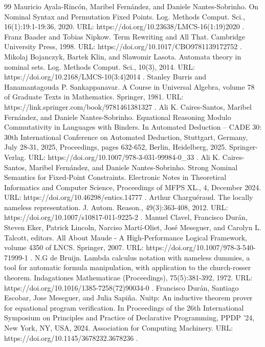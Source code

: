 \documentclass[10pt,a4paper]{amsart}
\begin{document}
\begin{thebibliography}{99}
 Mauricio Ayala-Rincón, Maribel Fernández, and Daniele Nantes-Sobrinho. On Nominal Syntax and Permutation Fixed Points. Log. Methods Comput. Sci., 16(1):19:1-19:36, 2020. URL: https://doi.org/10.23638/LMCS-16(1:19)2020 .
 Franz Baader and Tobias Nipkow. Term Rewriting and All That. Cambridge University Press, 1998. URL: https://doi.org/10.1017/CBO9781139172752 .
 Mikolaj Bojanczyk, Bartek Klin, and Slawomir Lasota. Automata theory in nominal sets. Log. Methods Comput. Sci., 10(3), 2014. URL: https://doi.org/10.2168/LMCS-10(3:4)2014 .
 Stanley Burris and Hanamantagouda P. Sankappanavar. A Course in Universal Algebra, volume 78 of Graduate Texts in Mathematics. Springer, 1981. URL: https://link.springer.com/book/9781461381327 .
 Ali K. Caires-Santos, Maribel Fernández, and Daniele Nantes-Sobrinho. Equational Reasoning Modulo Commutativity in Languages with Binders. In Automated Deduction – CADE 30: 30th International Conference on Automated Deduction, Stuttgart, Germany, July 28-31, 2025, Proceedings, pages 632-652, Berlin, Heidelberg, 2025. Springer-Verlag. URL: https://doi.org/10.1007/978-3-031-99984-0\_33 .
 Ali K. Caires-Santos, Maribel Fernández, and Daniele Nantes-Sobrinho. Strong Nominal Semantics for Fixed-Point Constraints. Electronic Notes in Theoretical Informatics and Computer Science, Proceedings of MFPS XL., 4, December 2024. URL: https://doi.org/10.46298/entics.14777 .
 Arthur Charguéraud. The locally nameless representation. J. Autom. Reason., 49(3):363-408, 2012. URL: https://doi.org/10.1007/s10817-011-9225-2 .
 Manuel Clavel, Francisco Durán, Steven Eker, Patrick Lincoln, Narciso Martí-Oliet, José Meseguer, and Carolyn L. Talcott, editors. All About Maude - A High-Performance Logical Framework, volume 4350 of LNCS. Springer, 2007. URL: https://doi.org/10.1007/978-3-540-71999-1 .
 N.G de Bruijn. Lambda calculus notation with nameless dummies, a tool for automatic formula manipulation, with application to the church-rosser theorem. Indagationes Mathematicae (Proceedings), 75(5):381-392, 1972. URL: https://doi.org/10.1016/1385-7258(72)90034-0 .
 Francisco Durán, Santiago Escobar, Jose Meseguer, and Julia Sapiña. Nuitp: An inductive theorem prover for equational program verification. In Proceedings of the 26th International Symposium on Principles and Practice of Declarative Programming, PPDP '24, New York, NY, USA, 2024. Association for Computing Machinery. URL: https://doi.org/10.1145/3678232.3678236 .

\end{thebibliography}
\end{document}
